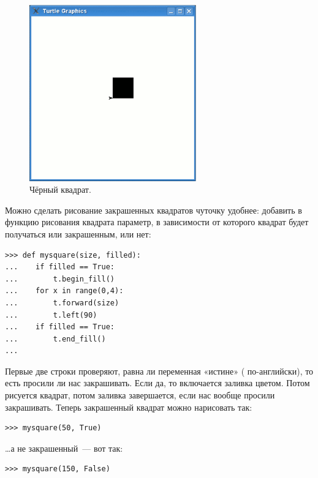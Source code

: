 \begin{figure}
\begin{center}
\includegraphics[width=72mm]{../en/figure27.eps}
\end{center}
\caption{Чёрный квадрат.}\label{fig27}
\end{figure}

Можно сделать рисование закрашенных квадратов чуточку удобнее: добавить в функцию рисования квадрата параметр, в зависимости от которого квадрат будет получаться или закрашенным, или нет:

\begin{listing}
\begin{verbatim}
>>> def mysquare(size, filled):
...    if filled == True:
...        t.begin_fill()
...    for x in range(0,4):
...        t.forward(size)
...        t.left(90)
...    if filled == True:
...        t.end_fill()
...
\end{verbatim}
\end{listing}

Первые две строки проверяют, равна ли переменная  «истине» ( по-английски), то есть просили ли нас закрашивать. Если да, то включается заливка цветом. Потом рисуется квадрат, потом заливка завершается, если нас вообще просили закрашивать. Теперь закрашенный квадрат можно нарисовать так:
\begin{listing}
\begin{verbatim}
>>> mysquare(50, True)
\end{verbatim}
\end{listing}

…а не закрашенный — вот так:

\begin{listing}
\begin{verbatim}
>>> mysquare(150, False)
\end{verbatim}
\end{listing}

